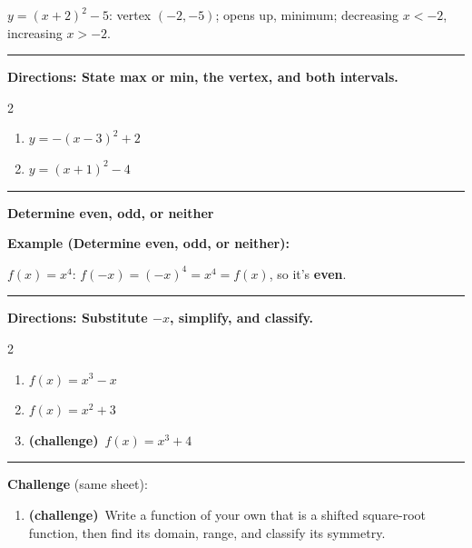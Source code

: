 \documentclass[12pt]{article}
\begin{document}
$y=(x+2)^2-5$: vertex $(-2,-5)$; opens up, minimum; decreasing $x<-2$, increasing $x>-2$.

\vspace{0.2cm}\hrule\vspace{0.35cm}
\textbf{Directions: State max or min, the vertex, and both intervals.}

\begin{multicols}{2}
\begin{enumerate}[label=\textbf{\arabic*.}, start=4, itemsep=2cm]
  \item $\displaystyle y=-(x-3)^{2}+2$
  \item $\displaystyle y=(x+1)^{2}-4$
\end{enumerate}
\end{multicols}
\vspace{0.25cm}\hrule\vspace{0.35cm}

\begin{center}{\Large \textbf{Determine even, odd, or neither}}\end{center}\vspace{0.2cm}
\textbf{Example (Determine even, odd, or neither):}

$f(x)=x^{4}$: $f(-x)=(-x)^4=x^4=f(x)$, so it's \textbf{even}.

\vspace{0.2cm}\hrule\vspace{0.35cm}
\textbf{Directions: Substitute $-x$, simplify, and classify.}

\begin{multicols}{2}
\begin{enumerate}[label=\textbf{\arabic*.}, start=6, itemsep=1.3cm]
  \item $\displaystyle f(x)=x^{3}-x$
  \item $\displaystyle f(x)=x^{2}+3$
  \item \textbf{(challenge)}\ $\displaystyle f(x)=x^{3}+4$
\end{enumerate}
\end{multicols}

\vspace{0.2cm}\hrule\vspace{0.3cm}
\textbf{Challenge} (same sheet):\\[4pt]
\begin{enumerate}[label=\textbf{\arabic*.}, start=9, itemsep=2.2cm]
  \item \textbf{(challenge)}\ Write a function of your own that is a shifted square-root function, then find its domain, range, and classify its symmetry.
\end{enumerate}
\end{document}
